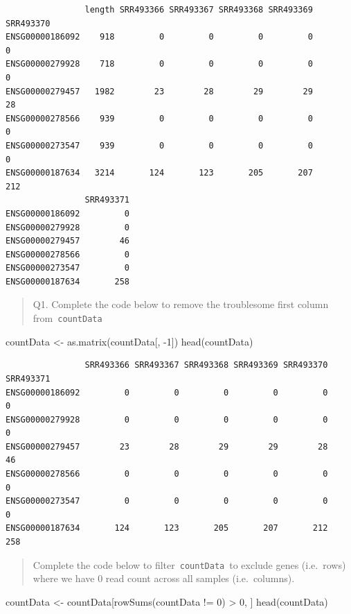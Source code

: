 \documentclass[
  letterpaper,
  DIV=11,
  numbers=noendperiod]{scrartcl}
\newenvironment{Shaded}{\begin{snugshade}}{\end{snugshade}}
\newcommand{\DecValTok}[1]{\textcolor[rgb]{0.68,0.00,0.00}{#1}}
\newcommand{\FunctionTok}[1]{\textcolor[rgb]{0.28,0.35,0.67}{#1}}
\newcommand{\NormalTok}[1]{\textcolor[rgb]{0.00,0.23,0.31}{#1}}
\newcommand{\OtherTok}[1]{\textcolor[rgb]{0.00,0.23,0.31}{#1}}
\newcommand{\SpecialCharTok}[1]{\textcolor[rgb]{0.37,0.37,0.37}{#1}}
\begin{document}
\begin{verbatim}
                length SRR493366 SRR493367 SRR493368 SRR493369 SRR493370
ENSG00000186092    918         0         0         0         0         0
ENSG00000279928    718         0         0         0         0         0
ENSG00000279457   1982        23        28        29        29        28
ENSG00000278566    939         0         0         0         0         0
ENSG00000273547    939         0         0         0         0         0
ENSG00000187634   3214       124       123       205       207       212
                SRR493371
ENSG00000186092         0
ENSG00000279928         0
ENSG00000279457        46
ENSG00000278566         0
ENSG00000273547         0
ENSG00000187634       258
\end{verbatim}

\begin{quote}
Q1. Complete the code below to remove the troublesome first column
from~\texttt{countData}
\end{quote}

\begin{Shaded}
\begin{Highlighting}[]
\NormalTok{countData }\OtherTok{\textless{}{-}} \FunctionTok{as.matrix}\NormalTok{(countData[, }\SpecialCharTok{{-}}\DecValTok{1}\NormalTok{])}
\FunctionTok{head}\NormalTok{(countData)}
\end{Highlighting}
\end{Shaded}

\begin{verbatim}
                SRR493366 SRR493367 SRR493368 SRR493369 SRR493370 SRR493371
ENSG00000186092         0         0         0         0         0         0
ENSG00000279928         0         0         0         0         0         0
ENSG00000279457        23        28        29        29        28        46
ENSG00000278566         0         0         0         0         0         0
ENSG00000273547         0         0         0         0         0         0
ENSG00000187634       124       123       205       207       212       258
\end{verbatim}

\begin{quote}
Complete the code below to filter~\texttt{countData}~to exclude genes
(i.e.~rows) where we have 0 read count across all samples
(i.e.~columns).
\end{quote}

\begin{Shaded}
\begin{Highlighting}[]
\NormalTok{countData }\OtherTok{\textless{}{-}}\NormalTok{ countData[}\FunctionTok{rowSums}\NormalTok{(countData }\SpecialCharTok{!=} \DecValTok{0}\NormalTok{) }\SpecialCharTok{\textgreater{}} \DecValTok{0}\NormalTok{, ]}
\FunctionTok{head}\NormalTok{(countData)}
\end{Highlighting}
\end{Shaded}
\end{document}
